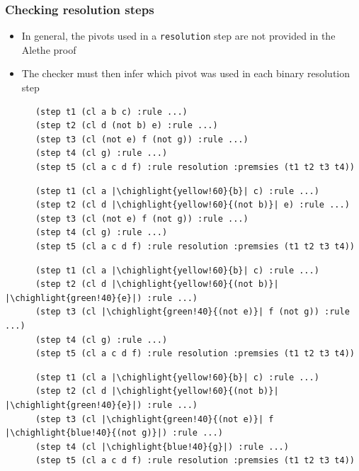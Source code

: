 \documentclass[usepdftitle=false,aspectratio=169]{beamer}
\newcommand\vitem{\vfill\item}
\newcommand\chighlight[2]{\setlength{\fboxsep}{0pt}\colorbox{#1}{#2\strut}}
\begin{document}
\begin{frame}[fragile]
  \frametitle{Checking resolution steps}
  \begin{itemize}
    \item In general, the pivots used in a \texttt{resolution} step are
      not provided in the Alethe proof
    \vitem The checker must then infer which pivot was used in each binary
    resolution step
  \end{itemize}
  \begin{overprint}
    \begin{verbatim}
      (step t1 (cl a b c) :rule ...)
      (step t2 (cl d (not b) e) :rule ...)
      (step t3 (cl (not e) f (not g)) :rule ...)
      (step t4 (cl g) :rule ...)
      (step t5 (cl a c d f) :rule resolution :premsies (t1 t2 t3 t4))
    \end{verbatim}
    \begin{verbatim}
      (step t1 (cl a |\chighlight{yellow!60}{b}| c) :rule ...)
      (step t2 (cl d |\chighlight{yellow!60}{(not b)}| e) :rule ...)
      (step t3 (cl (not e) f (not g)) :rule ...)
      (step t4 (cl g) :rule ...)
      (step t5 (cl a c d f) :rule resolution :premsies (t1 t2 t3 t4))
    \end{verbatim}
    \begin{verbatim}
      (step t1 (cl a |\chighlight{yellow!60}{b}| c) :rule ...)
      (step t2 (cl d |\chighlight{yellow!60}{(not b)}| |\chighlight{green!40}{e}|) :rule ...)
      (step t3 (cl |\chighlight{green!40}{(not e)}| f (not g)) :rule ...)
      (step t4 (cl g) :rule ...)
      (step t5 (cl a c d f) :rule resolution :premsies (t1 t2 t3 t4))
    \end{verbatim}
    \begin{verbatim}
      (step t1 (cl a |\chighlight{yellow!60}{b}| c) :rule ...)
      (step t2 (cl d |\chighlight{yellow!60}{(not b)}| |\chighlight{green!40}{e}|) :rule ...)
      (step t3 (cl |\chighlight{green!40}{(not e)}| f |\chighlight{blue!40}{(not g)}|) :rule ...)
      (step t4 (cl |\chighlight{blue!40}{g}|) :rule ...)
      (step t5 (cl a c d f) :rule resolution :premsies (t1 t2 t3 t4))
    \end{verbatim}
  \end{overprint}
\end{frame}
\end{document}
